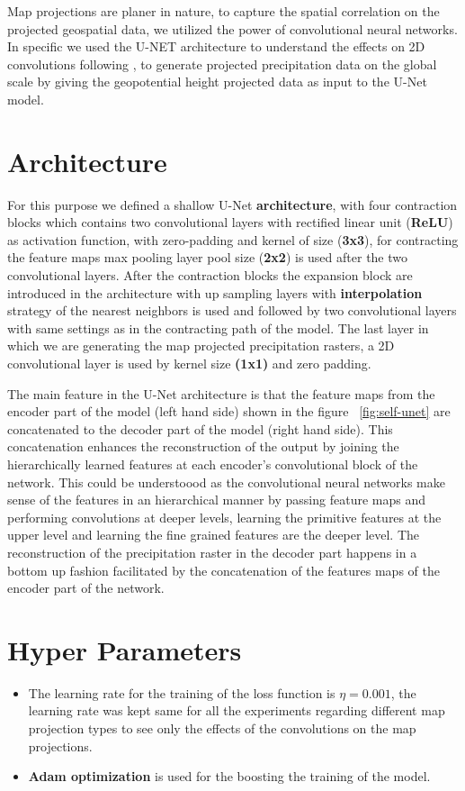 Map projections are planer in nature, to capture the spatial correlation on the projected geospatial data, we utilized the power of convolutional neural networks.
In specific we used the U-NET \cite{ronneberger2015unet}  architecture to understand the effects on 2D convolutions following \cite{trebing2021smaatunet}, to generate projected precipitation data on the global scale by giving the geopotential height projected data as input to the U-Net model.

\section{Architecture}
For this purpose we defined a shallow U-Net \textbf{architecture}, with four contraction blocks which contains two convolutional layers with rectified linear unit (\textbf{ReLU}) as activation function, with zero-padding and kernel of size (\textbf{3x3}), for contracting the feature maps max pooling layer pool size (\textbf{2x2}) is used after the two convolutional layers.
After the contraction blocks the expansion block are introduced in the architecture with up sampling layers with \textbf{interpolation} strategy of the nearest neighbors is used and followed by two convolutional layers with same settings as in the contracting path of the model.
The last layer in which we are generating the map projected precipitation rasters, a 2D convolutional layer is used by kernel size  \textbf{(1x1)} and zero padding.

The main feature in the U-Net architecture is that the feature maps from the encoder part of the model (left hand side) shown in the figure ~\ref{fig:self-unet} are concatenated to the decoder part of the model (right hand side).
This concatenation enhances the reconstruction of the output by joining the hierarchically learned features at each encoder's convolutional block of the network. This could be understoood as the convolutional neural networks make sense of the features in an hierarchical manner by passing feature maps and performing convolutions at deeper levels, learning the primitive features at the upper level and learning the fine grained features are the deeper level. The reconstruction of the precipitation raster in the decoder part happens in a bottom up fashion facilitated by the concatenation of the features maps of the encoder part of the network.

\section{Hyper Parameters}
\begin{itemize}
    \item The learning rate for the training of the loss function is $\eta = 0.001$, the learning rate was kept same for all the experiments regarding different map projection types to see only the effects of the convolutions on the map projections.
    \item \textbf{Adam optimization} is used for the boosting the training of the model.
\end{itemize}

